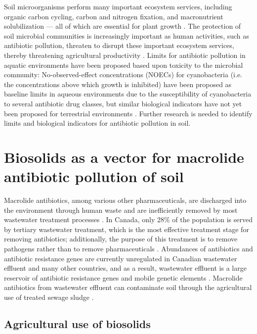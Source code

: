 Soil microorganisms perform many important ecosystem services, including organic carbon cycling, carbon and nitrogen fixation, and macronutrient solubilization --- all of which are essential for plant growth \parencite{Waldrop.2019}.
The protection of soil microbial communities is increasingly important as human activities, such as antibiotic pollution, threaten to disrupt these important ecosystem services, thereby threatening agricultural productivity \parencite{French.2009}.
Limits for antibiotic pollution in aquatic environments have been proposed based upon toxicity to the microbial community:
No-observed-effect concentrations (NOECs) for cyanobacteria (i.e. the concentrations above which growth is inhibited) have been proposed as baseline limits in aqueous environments due to the susceptibility of cyanobacteria to several antibiotic drug classes, but similar biological indicators have not yet been proposed for terrestrial environments \parencite{CommitteeforMedicinalProductsforHumanUse.2015, Tell.2019}.
Further research is needed to identify limits and biological indicators for antibiotic pollution in soil.

\section{Biosolids as a vector for macrolide antibiotic pollution of soil}

Macrolide antibiotics, among various other pharmaceuticals, are discharged into the environment through human waste and are inefficiently removed by most wastewater treatment processes \parencite{LeMinh.2010, Luo.2014}.
In Canada, only 28\% of the population is served by tertiary wastewater treatment, which is the most effective treatment stage for removing antibiotics;
additionally, the purpose of this treatment is to remove pathogens rather than to remove pharmaceuticals \parencite{EnvironmentandClimateChangeCanada.2020, LeMinh.2010}.
Abundances of antibiotics and antibiotic resistance genes are currently unregulated in Canadian wastewater effluent and many other countries, and as a result, wastewater effluent is a large reservoir of antibiotic resistance genes and mobile genetic elements \parencite{Rizzo.2013, Che.2019}.
Macrolide antibiotics from wastewater effluent can contaminate soil through the agricultural use of treated sewage sludge \parencite{McClellan.2010, Sabourin.2012}.

\subsection{Agricultural use of biosolids}

